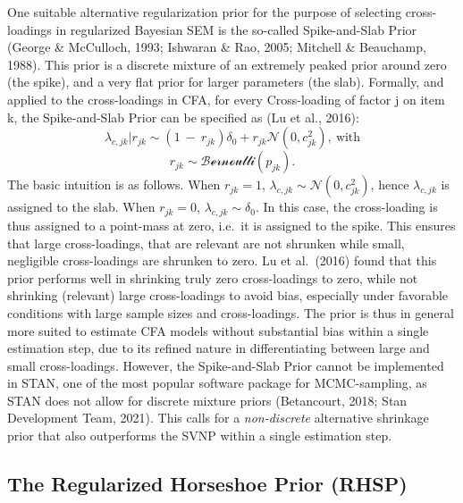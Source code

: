 \documentclass[
  man, donotrepeattitle,floatsintext]{apa6}
\begin{document}
One suitable alternative regularization prior for the purpose of selecting cross-loadings in
regularized Bayesian SEM is the so-called Spike-and-Slab Prior (George \& McCulloch, 1993; Ishwaran \& Rao, 2005; Mitchell \& Beauchamp, 1988). This prior is a discrete mixture of an extremely peaked prior around zero (the spike), and a very flat prior for larger parameters (the slab). Formally, and applied to the cross-loadings in CFA, for every Cross-loading of factor j
on item k, the Spike-and-Slab Prior can be specified as (Lu et al., 2016):
\[\lambda_{c,jk} |r_{jk} \sim (1 \ - \ r_{jk})\delta_0 + r_{jk} \mathcal{N}(0, c^2_{jk}) , \ \text{with}\]
\[r_{jk} \sim \mathcal{Bernoulli}(p_{jk}).\]
The basic intuition is as follows. When \(r_{jk} = 1\), \(\lambda_{c,jk} \sim \mathcal{N}(0, c^2_{jk})\), hence \(\lambda_{c,jk}\) is assigned to the slab. When \(r_{jk} = 0\), \(\lambda_{c,jk} \sim \delta_0\). In this case, the cross-loading is thus assigned to a point-mass at zero, i.e.~it is assigned to the spike. This ensures that large cross-loadings, that are relevant are not shrunken while small, negligible cross-loadings are shrunken to zero. Lu et al.~(2016) found that this prior performs well in shrinking truly zero cross-loadings to zero, while not shrinking (relevant) large cross-loadings to avoid bias, especially under favorable conditions with large sample sizes and cross-loadings. The prior is thus in general more suited to estimate CFA models without substantial bias within a single estimation step, due to its refined nature in differentiating between large and small cross-loadings. However, the Spike-and-Slab Prior cannot be implemented in STAN, one of the most popular software package for MCMC-sampling, as STAN does not allow for discrete mixture priors (Betancourt, 2018; Stan Development Team, 2021). This calls for a \emph{non-discrete} alternative shrinkage prior that also outperforms the SVNP within a single estimation step.

\hypertarget{the-regularized-horseshoe-prior-rhsp}{%
\subsection{The Regularized Horseshoe Prior (RHSP)}\label{the-regularized-horseshoe-prior-rhsp}}
\end{document}
